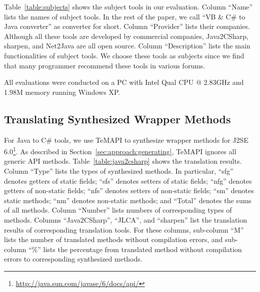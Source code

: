 Table~\ref{table:subjects} shows the subject tools in our evaluation. Column ``Name'' lists the names of subject tools. In the rest of the paper, we call ``VB \& C\# to Java converter'' as converter for short. Column ``Provider'' lists their companies. Although all these tools are developed by commercial companies, Java2CSharp, sharpen, and Net2Java are all open source. Column ``Description'' lists the main functionalities of subject tools. We choose these tools as subjects since we find that many programmer recommend these tools in various forums.

All evaluations were conducted on a PC with Intel Qual CPU @
2.83GHz and 1.98M memory running Windows XP.

\subsection{Translating Synthesized Wrapper Methods}
\label{sec:evaluation:invocation}
For Java to C\# tools, we use TeMAPI to synthesize wrapper methods for J2SE 6.0\footnote{\url{http://java.sun.com/javase/6/docs/api/}}. As described in Section~\ref{sec:approach:generating}, TeMAPI ignores all generic API methods. Table~\ref{table:java2csharp} shows the translation results. Column ``Type'' lists the types of synthesized methods. In particular, ``sfg'' denotes getters of static fields; ``sfs'' denotes setters of static fields; ``nfg'' denotes getters of non-static fields; ``nfs'' denotes setters of non-static fields; ``sm'' denotes static methods; ``nm'' denotes non-static methods; and ``Total'' denotes the sums of all methods. Column ``Number'' lists numbers of corresponding types of methods. Columns ``Java2CSharp'', ``JLCA'', and ``sharpen'' list the translation results of corresponding translation tools. For these columns, sub-column ``M'' lists the number of translated methods without compilation errors, and sub-column ``\%'' lists the percentage from translated method without compilation errors to corresponding synthesized methods.

